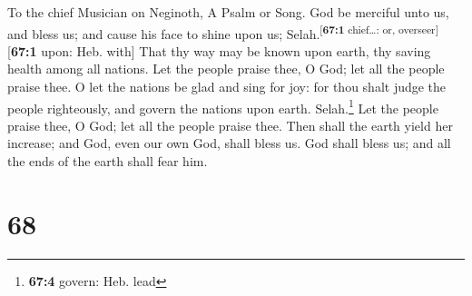 To the chief Musician on Neginoth, A Psalm or Song.  God
be merciful unto us, and bless us; and cause his face to shine upon us;
Selah.\textsuperscript{{[}\textbf{67:1} chief\ldots: or,
overseer{]}}{[}\textbf{67:1} upon: Heb. with{]}  That thy
way may be known upon earth, thy saving health among all nations.
 Let the people praise thee, O God; let all the people
praise thee.  O let the nations be glad and sing for joy:
for thou shalt judge the people righteously, and govern the nations upon
earth. Selah.\footnote{\textbf{67:4} govern: Heb. lead} 
Let the people praise thee, O God; let all the people praise thee.
 Then shall the earth yield her increase; and God, even
our own God, shall bless us.  God shall bless us; and all
the ends of the earth shall fear him.

\hypertarget{section-67}{%
\section{68}\label{section-67}}

